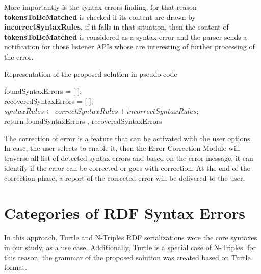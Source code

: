 More importantly is the syntax errors finding, for that reason \textbf{tokensToBeMatched} is checked if its content are drawn by \textbf{incorrectSyntaxRules}, if it falls in that situation, then the content of \textbf{tokensToBeMatched} is considered as a syntax error and the parser sends a notification for those listener APIs  whose are interesting of further processing of the error. 

\begin{algorithm}[] 
 \caption{Representation of the proposed solution  in pseudo-code}
 \label{alg:algorithm-main}

foundSyntaxErrors = [ ];\\
recoveredSyntaxErrors = [ ];\\
$syntaxRules \leftarrow correctSyntaxRules + incorrectSyntaxRules;$\\
return foundSyntaxErrors , recoveredSyntaxErrors
\end{algorithm}

The correction of error is a feature that can be activated with the user options. In case, the user selects to enable it, then the Error Correction Module will traverse all list of detected syntax errors and based on the error message, it can identify if the error can be corrected or goes with correction. At the end of the correction phase, a report of the corrected error will be delivered to the user. 

\section{Categories of RDF Syntax Errors}
 In this approach, Turtle and N-Triples RDF serializations were the core syntaxes in our study, as a use case. Additionally, Turtle is a special case of N-Triples. for this reason, the grammar of the proposed solution was created based on Turtle format. 
 
